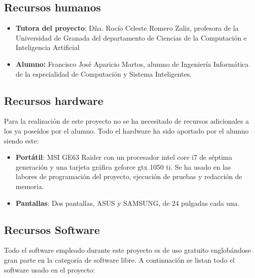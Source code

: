 \subsection{Recursos humanos}

\begin{itemize}
    \item \textbf{Tutora del proyecto}: Dña. Rocío Celeste Romero Zaliz, profesora de la Universidad de Granada del departamento de Ciencias de la Computación e Inteligencia Artificial
    \item \textbf{Alumno:} Francisco José Aparicio Martos, alumno de Ingeniería Informática de la especialidad de Computación y Sistema Inteligentes.
\end{itemize}

\subsection{Recursos hardware}
Para la realización de este proyecto no se ha necesitado de recursos adicionales a los ya poseídos por el alumno. Todo el hardware ha sido aportado por el alumno siendo este:
\begin{itemize}
    \item \textbf{Portátil}: MSI GE63 Raider con un procesador intel core i7 de séptima generación y una tarjeta gráfica geforce gtx 1050 ti. Se ha usado en las labores de programación del proyecto, ejecución de pruebas y redacción de memoria.
    
    \item \textbf{Pantallas}: Dos pantallas, ASUS y SAMSUNG, de 24 pulgadas cada una.
\end{itemize}

\subsection{Recursos Software}
Todo el software empleado durante este proyecto es de uso gratuito englobándose gran parte en la categoría de software libre. A continuación se listan todo el software usado en el proyecto:

